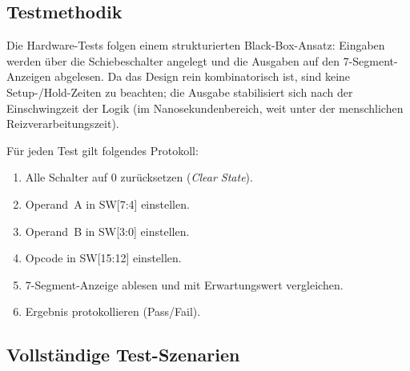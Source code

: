 ﻿\documentclass[12pt,a4paper]{report}
\begin{document}
\subsection{Testmethodik}
\label{subsec:testmethodik}

Die Hardware-Tests folgen einem strukturierten Black-Box-Ansatz: Eingaben werden über die Schiebeschalter angelegt und die Ausgaben auf den 7-Segment-Anzeigen abgelesen. Da das Design rein kombinatorisch ist, sind keine Setup-/Hold-Zeiten zu beachten; die Ausgabe stabilisiert sich nach der Einschwingzeit der Logik (im Nanosekundenbereich, weit unter der menschlichen Reizverarbeitungszeit).

Für jeden Test gilt folgendes Protokoll:
\begin{enumerate}
  \item Alle Schalter auf 0 zurücksetzen (\textit{Clear State}).
  \item Operand~A in SW[7:4] einstellen.
  \item Operand~B in SW[3:0] einstellen.
  \item Opcode in SW[15:12] einstellen.
  \item 7-Segment-Anzeige ablesen und mit Erwartungswert vergleichen.
  \item Ergebnis protokollieren (Pass/Fail).
\end{enumerate}

\subsection{Vollständige Test-Szenarien}
\label{subsec:test_szenarien}
\end{document}

